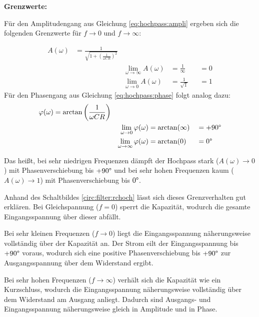 \begin{frame}
{    \textbf{Grenzwerte:}

    Für den Amplitudengang aus Gleichung \ref{eq:hochpass:ampli} ergeben sich die folgenden Grenzwerte 
    für $f \rightarrow 0$ und $f \rightarrow \infty$:
    
    \begin{align}
        &&A(\omega) &=\frac{1}{\sqrt{1 + \left(\frac{1}{\omega CR}\right)^2}}&  &                   &&          &&\nonumber\\
        &&          &&  \lim_{\omega \rightarrow \infty}A(\omega)               &=\frac{1}{\infty}  &&=0        &&\\
        &&          &&  \lim_{\omega \rightarrow 0}A(\omega)                    &=\frac{1}{\sqrt{1}}&&=1        &&\nonumber
    \end{align}
    Für den Phasengang aus Gleichung \ref{eq:hochpass:phase} folgt analog dazu:
    \begin{align}
        &&\varphi(\omega)   &=\arctan\left(\frac{1}{\omega CR}\right)&          &                   &&          &&\nonumber\\
        &&          &&  \lim_{\omega \rightarrow 0}\varphi(\omega)              &=\arctan(\infty)   &&=+90\degree&&\\
        &&          &&  \lim_{\omega \rightarrow \infty}\varphi(\omega)          &=\arctan(0)        &&=0\degree &&\nonumber
    \end{align}

    Das heißt, bei sehr niedrigen Frequenzen dämpft der Hochpass stark ($A(\omega) \rightarrow 0$) mit Phasenverschiebung bis $+90\degree$
    und bei sehr hohen Frequenzen kaum ($A(\omega) \rightarrow 1$) mit Phasenverschiebung bis $0\degree$.

    Anhand des Schaltbildes \ref{circ:filter:rchoch} lässt sich dieses Grenzverhalten gut erklären.
    Bei Gleichspannung ($f=0$) sperrt die Kapazität, wodurch die gesamte Eingangsspannung über dieser abfällt.
     
    Bei sehr kleinen Frequenzen ($f \to 0$) liegt die Eingangsspannung näherungsweise vollständig über der Kapazität an. 
    Der Strom eilt der Eingangsspannung bis $+90\degree$ voraus, wodurch sich eine positive Phasenverschiebung 
    bis $+90\degree$ zur Ausgangsspannung über dem Widerstand ergibt.

    Bei sehr hohen Frequenzen ($f \rightarrow \infty$) verhält sich die Kapazität wie ein Kurzschluss, 
    wodurch die Eingangsspannung näherungsweise vollständig über dem Widerstand am Ausgang anliegt.
    Dadurch sind Ausgangs- und Eingangsspannung näherungsweise gleich in Amplitude und in Phase.

}
\end{frame}
